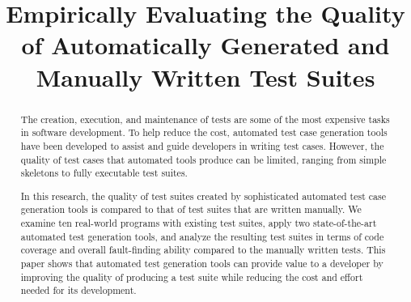 \documentclass[conference]{IEEEtran}
\begin{document}
\title{Empirically Evaluating the Quality of Automatically Generated and Manually Written Test Suites}

\author{
\and
{}
}

\maketitle
\begin{abstract}
The creation, execution, and maintenance of tests are some of the most expensive tasks in software development. To help reduce the cost, automated test case generation tools have been developed to assist and guide developers in writing test cases. However, the quality of test cases that automated tools produce can be limited, ranging from simple skeletons to fully executable test suites.
  
In this research, the quality of test suites created by sophisticated automated test case generation tools is compared to that of test suites that are written manually. We examine ten real-world programs with existing test suites, apply two state-of-the-art automated test generation tools, and analyze the resulting test suites in terms of code coverage and overall fault-finding ability compared to the manually written tests. This paper shows that automated test generation tools can provide value to a developer by improving the quality of producing a test suite while reducing the cost and effort needed for its development.
\end{abstract}









\end{document}
